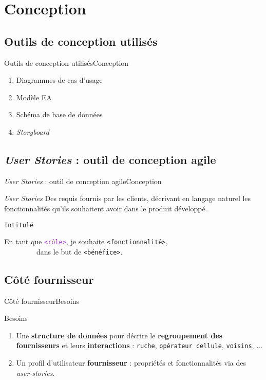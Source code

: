 \documentclass[usenames,dvipsnames]{beamer}
\begin{document}
\section{Conception}
\subsection{Outils de conception utilisés}

\begin{frame}{Outils de conception utilisés}{Conception}
\begin{enumerate}
  \item Diagrammes de cas d'usage
  \item Modèle EA
  \item Schéma de base de données
  \item \textit{Storyboard}
\end{enumerate}
\end{frame}

\subsection{\protect\textit{User Stories} : outil de conception agile}
\begin{frame}{\textit{User Stories} : outil de conception agile}{Conception}
\begin{block}{\textit{User Stories}}
Des requis fournis par les clients, décrivant en langage naturel les fonctionnalités qu'ils souhaitent avoir dans le produit développé.
\end{block}

\begin{block}{\textcolor{Sepia}{\texttt{Intitulé}}}
\begin{it}
  En tant que \textcolor{DarkOrchid}{\texttt{<rôle>}}, je souhaite \textcolor{BrickRed}{\texttt{<fonctionnalité>}}, \\
  ~~~~~~~~~dans le but de \textcolor{OliveGreen}{\texttt{<bénéfice>}}.
\end{it}
\end{block}
\end{frame}

\subsection{Côté fournisseur}
\begin{frame}{Côté fournisseur}{Besoins}
\begin{block}{Besoins}
\begin{enumerate}
  \item Une \textbf{structure de données} pour décrire le \textbf{regroupement des fournisseurs} et leurs \textbf{interactions} : \texttt{ruche}, \texttt{opérateur cellule}, \texttt{voisins}, $\dots$
  \item Un profil d'utilisateur \textbf{fournisseur} : propriétés et fonctionnalités via des \textit{user-stories}.
\end{enumerate}
\end{block}
\end{frame}
\end{document}
